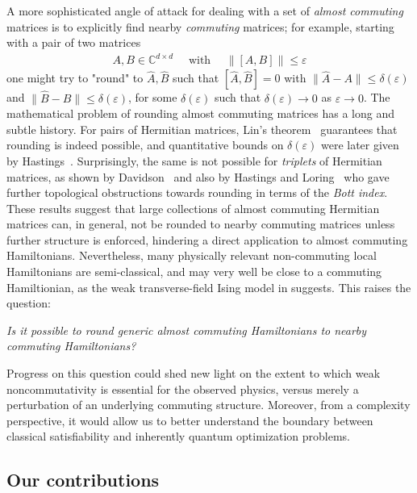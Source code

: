 \documentclass[11pt]{article}
\theoremstyle{plain}
\newcommand{\eps}{\varepsilon}
\begin{document}
A more sophisticated angle of attack for dealing with a set of \emph{almost commuting} matrices is to explicitly find nearby \emph{commuting} matrices; for example, starting with a pair of two matrices
\begin{align}
A,B \in \mathbb{C}^{d \times d}\quad \text{ with } \quad \|[A,B]\| \leq \eps    
\end{align}
one might try to "round" to $\hat{A},\hat{B}$ such that $[\hat A,\hat B]=0$ with $\|\hat A-A\| \leq \delta(\eps)$ and
$\|\hat B-B\| \leq \delta(\eps)$, for some $\delta(\eps)$ such that $\delta(\eps) \rightarrow 0$ as $\eps \rightarrow 0$.
The mathematical problem of rounding almost commuting matrices has a long and subtle history.  For pairs of 
Hermitian matrices, Lin's theorem~\cite{Lin1997} guarantees that rounding is indeed possible, and
quantitative bounds on $\delta(\eps)$ were later given by Hastings~\cite{Hastings_2009,herrera2022hastingsapproachlinstheorem}.  
Surprisingly, the same is not possible for \emph{triplets} of Hermitian matrices, as shown by Davidson~\cite{Davidson1985} and also by 
Hastings and Loring~\cite{Hastings_2010} who gave further topological obstructions towards rounding in terms of the \emph{Bott index}. These results suggest that large collections of almost commuting Hermitian matrices can, in general, not be rounded to nearby commuting matrices unless further structure is enforced, hindering a direct application to almost commuting Hamiltonians. Nevertheless, many physically relevant non-commuting local Hamiltonians are semi-classical, and may very well be close to a commuting Hamiltionian, as the weak transverse-field Ising model in  suggests. This raises the question:
\begin{center}
\emph{Is it possible to round generic almost commuting Hamiltonians
to nearby commuting Hamiltonians?}
\end{center}



Progress on this question could shed new light on the extent to which weak noncommutativity is essential for the observed physics, versus merely a perturbation of an underlying commuting structure. Moreover, from a complexity perspective, it would allow us to better understand the boundary between classical satisfiability and inherently quantum optimization problems.



\subsection{Our contributions}
\end{document}
